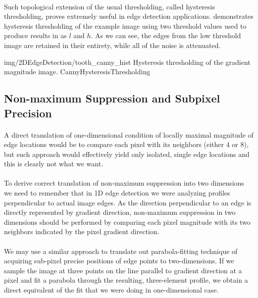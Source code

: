 \paragraph*{}
Such topological extension of the usual thresholding, called hysteresis thresholding, proves extremely useful in edge detection applications.  demonstrates hysteresis thresholding of the example image using two threshold values used to produce results in  as $l$ and $h$. As we can see, the edges from the low threshold image are retained in their entirety, while all of the noise is attenuated.

\oneFigure
{img/2DEdgeDetection/tooth_canny_hist}
{Hysteresis thresholding of the gradient magnitude image.}
{CannyHysteresisThresholding}
{\basicWidth}

\subsection{Non-maximum Suppression and Subpixel Precision}

\paragraph*{}
A direct translation of one-dimensional condition of locally maximal magnitude of edge locations would be to compare each pixel with its neighbors (either 4 or 8), but such approach would effectively yield only isolated, single edge locations and this is clearly not what we want.

\paragraph*{}
To derive correct translation of non-maximum suppression into two dimensions we need to remember that in 1D edge detection we were analyzing profiles perpendicular to actual image edges. As the direction perpendicular to an edge is directly represented by gradient direction, non-maximum suppression in two dimensions should be performed by comparing each pixel magnitude with its two neighbors indicated by the pixel gradient direction.

\paragraph*{}
We may use a similar approach to translate out parabola-fitting technique of acquiring sub-pixel precise positions of edge points to two-dimensions. If we sample the image at three points on the line parallel to gradient direction at a pixel and fit a parabola through the resulting, three-element profile, we obtain a direct equivalent of the fit that we were doing in one-dimensional case.

